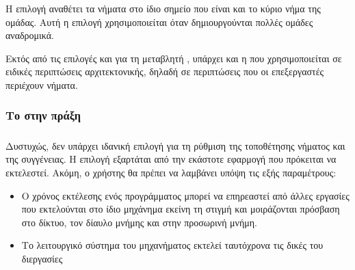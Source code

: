 Η επιλογή \emph{} αναθέτει τα νήματα στο ίδιο σημείο που είναι και το κύριο νήμα της ομάδας.
Αυτή η επιλογή χρησιμοποιείται όταν δημιουργούνται πολλές ομάδες αναδρομικά.

Εκτός από τις επιλογές \emph{} και \emph{} για τη μεταβλητή \emph{}, υπάρχει και η
\emph{} που χρησιμοποιείται σε ειδικές περιπτώσεις αρχιτεκτονικής, δηλαδή σε περιπτώσεις που οι επεξεργαστές
περιέχουν νήματα\cite{affinity2}.

\clearpage
\subsubsection{Το \emph{} στην πράξη}
\subparagraph{}
Δυστυχώς, δεν υπάρχει ιδανική επιλογή για τη ρύθμιση της τοποθέτησης νήματος και της συγγένειας. Η επιλογή
εξαρτάται από την εκάστοτε εφαρμογή που πρόκειται να εκτελεστεί. Ακόμη, ο χρήστης θα πρέπει να λαμβάνει υπόψη τις εξής
παραμέτρους\cite{affinity3}:
\begin{itemize}
\item{Ο χρόνος εκτέλεσης ενός προγράμματος μπορεί να επηρεαστεί από άλλες εργασίες που εκτελούνται στο ίδιο μηχάνημα εκείνη τη στιγμή και μοιράζονται πρόσβαση στο δίκτυο, τον δίαυλο μνήμης και στην προσωρινή μνήμη.}
\item{Το λειτουργικό σύστημα του μηχανήματος εκτελεί ταυτόχρονα τις δικές του διεργασίες}
\end{itemize}